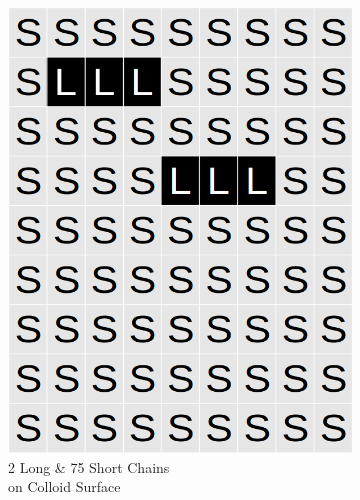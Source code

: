 \documentclass[journal=jacsat,manuscript=article]{achemso}
\begin{document}
\begin{figure}[H]
\begin{subfigure}[b]{0.4\textwidth}
        \includegraphics[scale=0.15]{fig8c.png}
        \caption{2 Long \& 75 Short Chains\\ on Colloid Surface}
        \label{fig:C}
    \end{subfigure}
    \begin{subfigure}[b]{0.4\textwidth}

\end{subfigure}
\end{figure}
\end{document}
